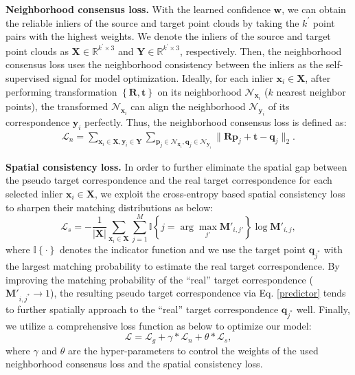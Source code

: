 \documentclass[letterpaper]{article} %
\begin{document}
	\noindent \textbf{Neighborhood consensus loss.} 
	With the learned confidence $\mathbf{w}$, we can obtain the reliable inliers of the source and target point clouds by taking the $k^\prime$ point pairs with the highest weights. 
	We denote the inliers of the source and target point clouds as $\mathbf{X}\in \mathbb{R}^{k^{\prime}\times3}$ and $\mathbf{Y}\in \mathbb{R}^{k^{\prime}\times3}$, respectively. 
	Then, the neighborhood consensus loss uses the neighborhood consistency between the inliers as the self-supervised signal for model optimization. 
	Ideally, for each inlier ${\mathbf{x}_i \in \mathbf{X}}$, after performing transformation $\left\{\mathbf{R},\mathbf{t}\right\}$ on its neighborhood $\mathcal{N}_{\mathbf{x}_i}$ ($k$ nearest neighbor points), the transformed $\mathcal{N}_{\mathbf{x}_i}$ can align the neighborhood $\mathcal{N}_{\mathbf{y}_i}$ of its correspondence $\mathbf{y}_i$ perfectly. 
	Thus, the neighborhood consensus loss is defined as:
	\begin{equation}
	\begin{split}
	 \mathcal{L}_{n} = \sum_{\mathbf{x}_i \in \mathbf{X}, \mathbf{y}_i \in \mathbf{Y}} \sum_{\mathbf{p}_j \in \mathcal{N}_{\mathbf{x}_i}, \mathbf{q}_j \in \mathcal{N}_{\mathbf{y}_i} } \|\mathbf{R}\mathbf{p}_j + \mathbf{t} - \mathbf{q}_j \|_{2}.	
	\end{split}
	\end{equation}
	
	\noindent \textbf{Spatial consistency loss.} 
	In order to further eliminate the spatial gap between the pseudo target correspondence and the real target correspondence for each selected inlier $\mathbf{x}_i \in \mathbf{X}$, we exploit the cross-entropy based spatial consistency loss to sharpen their matching distributions as below:
	\begin{equation}\label{eq}
	\mathcal{L}_s = -\frac{1}{|\mathbf{X}|}\sum_{\mathbf{x}_i\in\mathbf{X}}\sum_{j=1}^M \mathbb{I}\left\{j=\arg\max_{j'}\mathbf{M}'_{i,j'}\right\}\log\mathbf{M}'_{i,j},
	\end{equation}
	where $\mathbb{I}\left\{\cdot\right\}$ denotes the indicator function and we use the target point $\mathbf{q}_{j^*}$ with the largest matching probability to estimate the real target correspondence. By improving the matching probability of the ``real'' target correspondence ($\mathbf{M}'_{i,j^*}\rightarrow 1$), the resulting pseudo target correspondence via Eq. \ref{predictor} tends to further spatially approach to the ``real'' target correspondence $\mathbf{q}_{j^*}$ well.  
	Finally, we utilize a comprehensive loss function as below to optimize our model:
	\begin{equation}
	\mathcal{L} = \mathcal{L}_g + \gamma * \mathcal{L}_{n} + \theta * \mathcal{L}_{s},
	\end{equation}
	where $\gamma$ and $\theta$ are the hyper-parameters to control the weights of the used neighborhood consensus loss and the spatial consistency loss.
	
\end{document}
